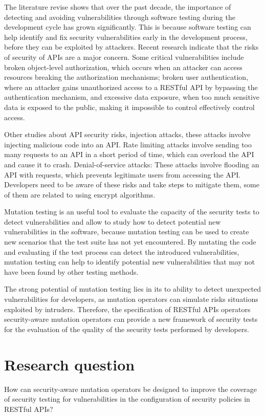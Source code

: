 The literature revise shows that over the past decade, the importance of detecting and avoiding vulnerabilities through software testing\cite{8564344} during the development cycle has grown significantly.  This is because software testing can help identify and fix security vulnerabilities early in the development process, before they can be exploited by attackers. Recent research indicate that the risks of security of APIs are a major concern. Some critical vulnerabilities include broken object-level authorization, which occurs when an attacker can access resources breaking the authorization mechanisms; broken user authentication, where an attacker gains unauthorized access to a RESTful API by bypassing the authentication mechanism, and excessive data exposure, when too much sensitive data is exposed to the public, making it impossible to control effectively control access.

Other studies about API security risks\cite{zenodo}, injection attacks, these attacks involve injecting malicious code into an API. Rate limiting attacks involve sending too many requests to an API in a short period of time, which can overload the API and cause it to crash. Denial-of-service attacks: These attacks involve flooding an API with requests, which prevents legitimate users from accessing the API. Developers need to be aware of these risks and take steps to mitigate them, some of them are related to using encrypt algorithms.

Mutation testing is an useful tool to evaluate the capacity of the security tests to detect vulnerabilities and allow to study how to detect potential new vulnerabilities in the software, because mutation testing can be used to create new scenarios that the test suite has not yet encountered. By mutating the code and evaluating if the test process can detect the introduced vulnerabilities, mutation testing can help to identify potential new vulnerabilities that may not have been found by other testing methods.

The strong potential of mutation testing lies in its to ability to detect unexpected vulnerabilities for developers, as mutation operators can simulate risks situations exploited by intruders. Therefore, the specification of RESTful APIs operators security-aware mutation operators can provide a new framework of security tests for the evaluation of the quality of the security tests performed by developers.

\section{Research question}

  How can security-aware mutation operators be designed to improve the coverage of security testing for vulnerabilities in the configuration of security policies in RESTful APIs?
